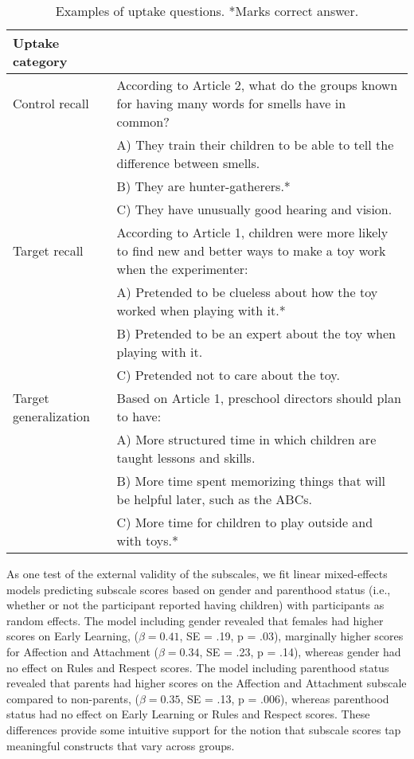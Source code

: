 \documentclass[10pt, letterpaper]{article}
\begin{document}
\begin{table*}[!h]
\centering
\begin{tabular}{p{1.25in}p{5.25in}}
  \hline
Uptake category \\ 
  \hline
Control recall 
& According to Article 2, what do the groups known for having many words for smells have in common? \\ 
  & A) They train their children to be able to tell the difference between smells.\\ 
  & B) They are hunter-gatherers.*\\ 
  & C) They have unusually good hearing and vision.\\ 
\hline
Target recall
  & According to Article 1, children were more likely to find new and better ways to make a toy work when the experimenter:\\ 
  & A) Pretended to be clueless about how the toy worked when playing with it.*\\ 
  & B) Pretended to be an expert about the toy when playing with it.\\ 
  & C) Pretended not to care about the toy.\\ 
  \hline
  Target generalization 
  & Based on Article 1, preschool directors should plan to have:\\ 
  & A) More structured time in which children are taught lessons and skills.\\ 
  & B) More time spent memorizing things that will be helpful later, such as the ABCs.\\
  & C) More time for children to play outside and with toys.*\\
\end{tabular}
\caption{Examples of uptake questions. *Marks correct answer. \label{tab:uptake}} 
\end{table*}

As one test of the external validity of the subscales, we fit linear
mixed-effects models predicting subscale scores based on gender and
parenthood status (i.e., whether or not the participant reported having
children) with participants as random effects. The model including
gender revealed that females had higher scores on Early Learning,
(\(\beta = 0.41\), SE = .19, p = .03), marginally higher scores for
Affection and Attachment (\(\beta = 0.34\), SE = .23, p = .14), whereas
gender had no effect on Rules and Respect scores. The model including
parenthood status revealed that parents had higher scores on the
Affection and Attachment subscale compared to non-parents,
(\(\beta = 0.35\), SE = .13, p = .006), whereas parenthood status had no
effect on Early Learning or Rules and Respect scores. These differences
provide some intuitive support for the notion that subscale scores tap
meaningful constructs that vary across groups.
\end{document}
